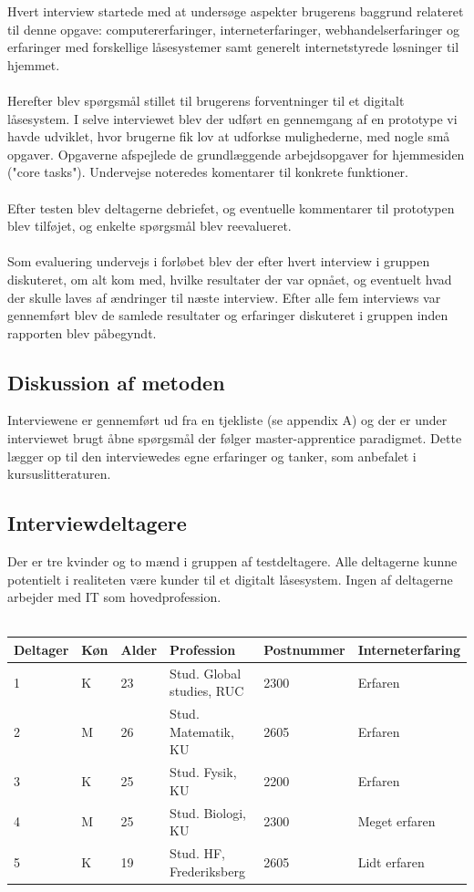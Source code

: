 \documentclass[a4paper,12pt]{article}
\begin{document}
Hvert interview startede med at undersøge aspekter brugerens baggrund relateret til denne opgave:
computererfaringer, interneterfaringer, webhandelserfaringer og erfaringer med forskellige låsesystemer samt generelt internetstyrede løsninger til hjemmet.
\\ \\
Herefter blev spørgsmål stillet til brugerens forventninger til et digitalt låsesystem.
I selve interviewet blev der udført en gennemgang af en prototype vi havde udviklet, hvor brugerne fik lov at udforkse mulighederne, med nogle små opgaver.
Opgaverne afspejlede de grundlæggende arbejdsopgaver for hjemmesiden ("core tasks"). Undervejse noteredes komentarer til konkrete funktioner.
\\ \\
Efter testen blev deltagerne debriefet, og eventuelle kommentarer til prototypen blev tilføjet, og enkelte spørgsmål blev reevalueret.
\\ \\
Som evaluering undervejs i forløbet blev der efter hvert interview i gruppen diskuteret, om alt
kom med, hvilke resultater der var opnået, og eventuelt hvad der skulle laves af ændringer til
næste interview. Efter alle fem interviews var gennemført blev de samlede resultater og erfaringer
diskuteret i gruppen inden rapporten blev påbegyndt.


\subsection{Diskussion af metoden}

Interviewene er gennemført ud fra en tjekliste (se appendix A) og der er under interviewet brugt
åbne spørgsmål der følger master-apprentice paradigmet. Dette lægger op til den interviewedes
egne erfaringer og tanker, som anbefalet i kursuslitteraturen.


\subsection{Interviewdeltagere}

Der er tre kvinder og to mænd i gruppen af testdeltagere. Alle deltagerne kunne potentielt i
realiteten være kunder til et digitalt låsesystem. Ingen af deltagerne arbejder med IT som
hovedprofession.
\\  \\
\begin{tabular}{|l|l|l|l|l|l|}
	\hline Deltager & Køn & Alder & Profession & Postnummer & Interneterfaring \\
	\hline 1 & K & 23  & Stud. Global studies, RUC & 2300 & Erfaren \\
	\hline 2 & M & 26 & Stud. Matematik, KU & 2605 & Erfaren\\
	\hline 3 & K & 25 & Stud. Fysik, KU & 2200 & Erfaren \\
	\hline 4 & M & 25 & Stud. Biologi, KU & 2300 & Meget erfaren \\
	\hline 5 & K & 19 & Stud. HF, Frederiksberg & 2605 & Lidt erfaren \\
	\hline
\end{tabular}
\\ \\
\end{document}
